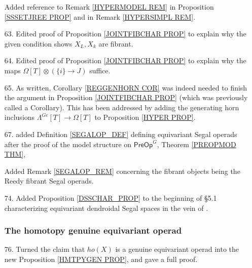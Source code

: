 \documentclass{article}
\begin{document}
\begin{itemize}
      Added reference to Remark \ref{HYPERMODEL REM} in Proposition \ref{SSSETJREE PROP} and in Remark \ref{HYPERSIMPL REM}.
      
\item[63.] Edited proof of Proposition \ref{JOINTFIBCHAR PROP} to explain why the given condition shows $X_L,X_k $ are fibrant.
      
\item[64.] Edited proof of Proposition \ref{JOINTFIBCHAR PROP} to explain why the maps $\Omega[T] \otimes (\{i\} \to J)$ suffice. %
      
\item[65.] As written, Corollary \ref{REGGENHORN COR} was indeed needed to finish the argument in Proposition \ref{JOINTFIBCHAR PROP} (which was previously called a Corollary). This has been addressed by adding the generating horn inclusions $\Lambda^{Ge}[T] \to \Omega[T]$ to Proposition \ref{HYPER PROP}. %
      
\item[67.] added Definition \ref{SEGALOP_DEF} defining equivariant Segal operads after the proof of the model structure on $\mathsf{PreOp}^G$, Theorem \ref{PREOPMOD THM},
      
      Added Remark \ref{SEGALOP_REM} concerning the fibrant objects being the Reedy fibrant Segal operads. %
      
\item[74.] Added Proposition \ref{DSSCHAR_PROP} to the beginning of \S 5.1 characterizing equivariant dendroidal Segal spaces in the vein of \cite[Cor. 5.6]{CM13a}. %



      
      \subsubsection*{The homotopy genuine equivariant operad}
\item[76.] Turned the claim that $ho(X)$ is a genuine equivariant operad into the new Proposition \ref{HMTPYGEN PROP}, and gave a full proof.
      
      

\end{itemize}
\end{document}
